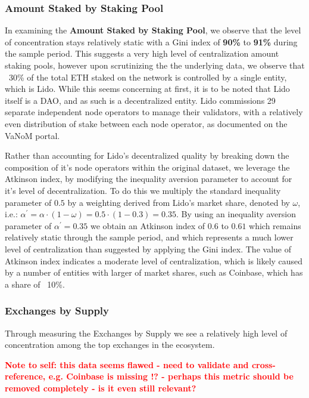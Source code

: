 \documentclass[conference]{IEEEtran}
\begin{document}
\subsubsection{Amount Staked by Staking Pool}
In examining the \textbf{Amount Staked by Staking Pool}, we observe that the level of concentration stays relatively static with a Gini index of \textbf{90\%} to \textbf{91\%} during the sample period.  This suggests a very high level of centralization amount staking pools, however upon scrutinizing the the underlying data, we observe that ~30\% of the total ETH staked on the network is controlled by a single entity, which is Lido.  While this seems concerning at first, it is to be noted that Lido itself is a DAO, and as such is a decentralized entity.  Lido commissions 29 separate independent node operators to manage their validators, with a relatively even distribution of stake between each node operator, as documented on the VaNoM portal\cite{lido2023}.

Rather than accounting for Lido's decentralized quality by breaking down the composition of it's node operators within the original dataset, we leverage the Atkinson index, by modifying the inequality aversion parameter to account for it's level of decentralization.  To do this we multiply the standard inequality parameter of $0.5$ by a weighting derived from Lido's market share, denoted by $\omega$, i.e.: $\alpha^\prime = \alpha \cdot \left( 1 - \omega \right) = 0.5 \cdot \left( 1 - 0.3 \right) = 0.35$.  By using an inequality aversion parameter of $\alpha^\prime=0.35$ we obtain an Atkinson index of $0.6$ to $0.61$ which remains relatively static through the sample period, and which represents a much lower level of centralization than suggested by applying the Gini index.  The value of Atkinson index indicates a moderate level of centralization, which is likely caused by a number of entities with larger of market shares, such as Coinbase, which has a share of ~10\%.

\subsubsection{Exchanges by Supply}

Through measuring the Exchanges by Supply we see a relatively high level of concentration among the top exchanges in the ecosystem.

\textbf{\textcolor{red}{Note to self: this data seems flawed - need to validate and cross-reference, e.g. Coinbase is missing !? - perhaps this metric should be removed completely - is it even still relevant?}}
\end{document}
